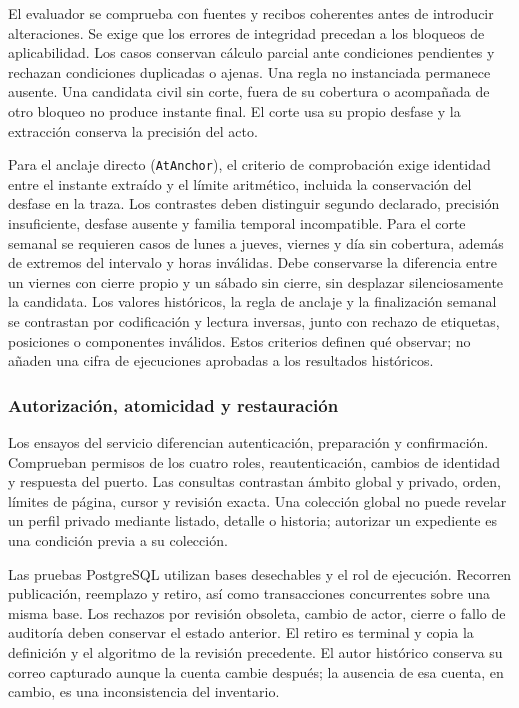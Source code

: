El evaluador se comprueba con fuentes y recibos coherentes antes de introducir alteraciones. Se exige que los errores de integridad precedan a los bloqueos de aplicabilidad. Los casos conservan cálculo parcial ante condiciones pendientes y rechazan condiciones duplicadas o ajenas. Una regla no instanciada permanece ausente. Una candidata civil sin corte, fuera de su cobertura o acompañada de otro bloqueo no produce instante final. El corte usa su propio desfase y la extracción conserva la precisión del acto.

Para el anclaje directo (\texttt{AtAnchor}), el criterio de comprobación exige identidad entre el instante extraído y el límite aritmético, incluida la conservación del desfase en la traza. Los contrastes deben distinguir segundo declarado, precisión insuficiente, desfase ausente y familia temporal incompatible. Para el corte semanal se requieren casos de lunes a jueves, viernes y día sin cobertura, además de extremos del intervalo y horas inválidas. Debe conservarse la diferencia entre un viernes con cierre propio y un sábado sin cierre, sin desplazar silenciosamente la candidata. Los valores históricos, la regla de anclaje y la finalización semanal se contrastan por codificación y lectura inversas, junto con rechazo de etiquetas, posiciones o componentes inválidos. Estos criterios definen qué observar; no añaden una cifra de ejecuciones aprobadas a los resultados históricos.

\subsubsection{Autorización, atomicidad y restauración}

Los ensayos del servicio diferencian autenticación, preparación y confirmación. Comprueban permisos de los cuatro roles, reautenticación, cambios de identidad y respuesta del puerto. Las consultas contrastan ámbito global y privado, orden, límites de página, cursor y revisión exacta. Una colección global no puede revelar un perfil privado mediante listado, detalle o historia; autorizar un expediente es una condición previa a su colección.

Las pruebas PostgreSQL utilizan bases desechables y el rol de ejecución. Recorren publicación, reemplazo y retiro, así como transacciones concurrentes sobre una misma base. Los rechazos por revisión obsoleta, cambio de actor, cierre o fallo de auditoría deben conservar el estado anterior. El retiro es terminal y copia la definición y el algoritmo de la revisión precedente. El autor histórico conserva su correo capturado aunque la cuenta cambie después; la ausencia de esa cuenta, en cambio, es una inconsistencia del inventario.

